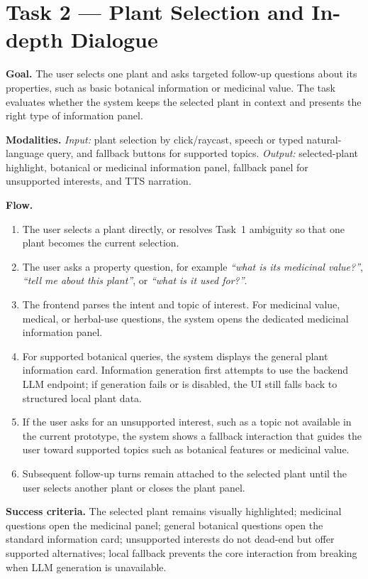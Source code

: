 \documentclass[12pt,a4paper]{article}
\newcommand{\tasksub}[1]{\par\smallskip\noindent\textbf{#1}\quad\ignorespaces}
\begin{document}
\section{Task 2 --- Plant Selection and In-depth Dialogue}
\tasksub{Goal.} The user selects one plant and asks targeted follow-up
questions about its properties, such as basic botanical information or
medicinal value. The task evaluates whether the system keeps the selected
plant in context and presents the right type of information panel.

\tasksub{Modalities.} \emph{Input:} plant selection by click/raycast, speech
or typed natural-language query, and fallback buttons for supported topics.
\emph{Output:} selected-plant highlight, botanical or medicinal information
panel, fallback panel for unsupported interests, and TTS narration.

\tasksub{Flow.}
\begin{enumerate}
    \item The user selects a plant directly, or resolves Task~1 ambiguity so
    that one plant becomes the current selection.
    \item The user asks a property question, for example
    \emph{``what is its medicinal value?''}, \emph{``tell me about this
    plant''}, or \emph{``what is it used for?''}.
    \item The frontend parses the intent and topic of interest. For medicinal
    value, medical, or herbal-use questions, the system opens the dedicated
    medicinal information panel.
    \item For supported botanical queries, the system displays the general
    plant information card. Information generation first attempts to use the
    backend LLM endpoint; if generation fails or is disabled, the UI still
    falls back to structured local plant data.
    \item If the user asks for an unsupported interest, such as a topic not
    available in the current prototype, the system shows a fallback interaction
    that guides the user toward supported topics such as botanical features or
    medicinal value.
    \item Subsequent follow-up turns remain attached to the selected plant
    until the user selects another plant or closes the plant panel.
\end{enumerate}

\tasksub{Success criteria.} The selected plant remains visually highlighted;
medicinal questions open the medicinal panel; general botanical questions open
the standard information card; unsupported interests do not dead-end but offer
supported alternatives; local fallback prevents the core interaction from
breaking when LLM generation is unavailable.
\end{document}
